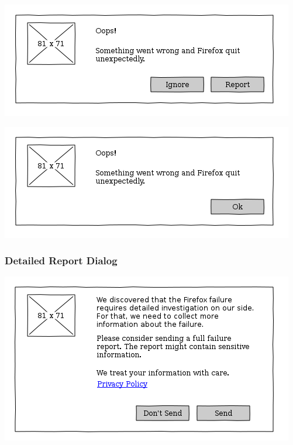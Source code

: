 \documentclass{article}
\begin{document}
\begin{center}
\includegraphics[width=\textwidth]{client-ui-apology-dialog-manual.png}
\end{center}

\begin{center}
\includegraphics[width=\textwidth]{client-ui-apology-dialog-automatic.png}
\end{center}

\subsubsection{Detailed Report Dialog}
\begin{center}
\includegraphics[width=\textwidth]{client-ui-detailed-report-dialog.png}
\end{center}
\end{document}
